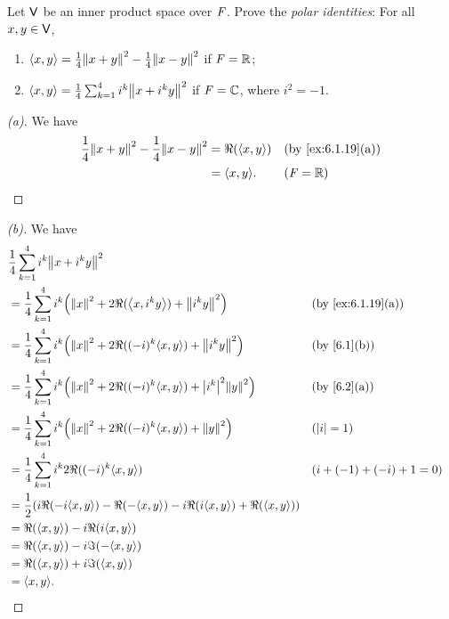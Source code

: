 \begin{ex}\label{ex:6.1.20}
  Let \(\mathsf{V}\) be an inner product space over \(\mathit{F}\).
  Prove the \emph{polar identities}:
  For all \(x, y \in \mathsf{V}\),
  \begin{enumerate}
    \item \(\inn{x, y} = \frac{1}{4} \norm{x + y}^2 - \frac{1}{4} \norm{x - y}^2\) if \(\mathit{F} = \mathbb{R}\);
    \item \(\inn{x, y} = \frac{1}{4} \sum_{k = 1}^4 i^k \norm{x + i^k y}^2\) if \(\mathit{F} = \mathbb{C}\), where \(i^2 = -1\).
  \end{enumerate}
\end{ex}

\begin{proof}[(a)]
  We have
  \begin{align*}
    \frac{1}{4} \norm{x + y}^2 - \frac{1}{4} \norm{x - y}^2 & = \Re(\inn{x, y}) &  & \by{ex:6.1.19}[a] \\
                                                            & = \inn{x, y}.     &  & (\F = \R)
  \end{align*}
\end{proof}

\begin{proof}[(b)]
  We have
  \begin{align*}
     & \frac{1}{4} \sum_{k = 1}^4 i^k \norm{x + i^k y}^2                                                                                   \\
     & = \frac{1}{4} \sum_{k = 1}^4 i^k \pa{\norm{x}^2 + 2 \Re(\inn{x, i^k y}) + \norm{i^k y}^2}            &  & \by{ex:6.1.19}[a]         \\
     & = \frac{1}{4} \sum_{k = 1}^4 i^k \pa{\norm{x}^2 + 2 \Re((-i)^k \inn{x, y}) + \norm{i^k y}^2}         &  & \by{6.1}[b]               \\
     & = \frac{1}{4} \sum_{k = 1}^4 i^k \pa{\norm{x}^2 + 2 \Re((-i)^k \inn{x, y}) + \abs{i^k}^2 \norm{y}^2} &  & \by{6.2}[a]               \\
     & = \frac{1}{4} \sum_{k = 1}^4 i^k \pa{\norm{x}^2 + 2 \Re((-i)^k \inn{x, y}) + \norm{y}^2}             &  & (\abs{i} = 1)             \\
     & = \frac{1}{4} \sum_{k = 1}^4 i^k 2 \Re((-i)^k \inn{x, y})                                            &  & (i + (-1) + (-i) + 1 = 0) \\
     & = \frac{1}{2} \pa{i \Re(-i \inn{x, y}) - \Re(-\inn{x, y}) - i \Re(i \inn{x, y}) + \Re(\inn{x, y})}                                  \\
     & = \Re(\inn{x, y}) - i \Re(i \inn{x, y})                                                                                             \\
     & = \Re(\inn{x, y}) - i \Im(-\inn{x, y})                                                                                              \\
     & = \Re(\inn{x, y}) + i \Im(\inn{x, y})                                                                                               \\
     & = \inn{x, y}.
  \end{align*}
\end{proof}

